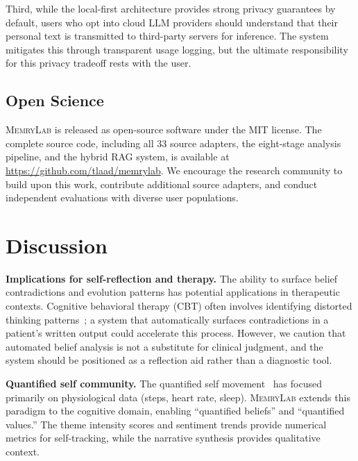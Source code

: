 \documentclass[manuscript,review]{acmart}
\begin{document}
Third, while the local-first architecture provides strong privacy guarantees by default, users who opt into cloud LLM providers should understand that their personal text is transmitted to third-party servers for inference.
The system mitigates this through transparent usage logging, but the ultimate responsibility for this privacy tradeoff rests with the user.

\subsection{Open Science}
\label{sec:open-science}

\textsc{MemryLab} is released as open-source software under the MIT license.
The complete source code, including all 33 source adapters, the eight-stage analysis pipeline, and the hybrid RAG system, is available at \url{https://github.com/tlaad/memrylab}.
We encourage the research community to build upon this work, contribute additional source adapters, and conduct independent evaluations with diverse user populations.


\section{Discussion}
\label{sec:discussion}

\textbf{Implications for self-reflection and therapy.}
The ability to surface belief contradictions and evolution patterns has potential applications in therapeutic contexts.
Cognitive behavioral therapy (CBT) often involves identifying distorted thinking patterns~\cite{beck1979cognitive}; a system that automatically surfaces contradictions in a patient's written output could accelerate this process.
However, we caution that automated belief analysis is not a substitute for clinical judgment, and the system should be positioned as a reflection aid rather than a diagnostic tool.

\textbf{Quantified self community.}
The quantified self movement~\cite{wolf2010quantified} has focused primarily on physiological data (steps, heart rate, sleep).
\textsc{MemryLab} extends this paradigm to the cognitive domain, enabling ``quantified beliefs'' and ``quantified values.''
The theme intensity scores and sentiment trends provide numerical metrics for self-tracking, while the narrative synthesis provides qualitative context.
\end{document}
